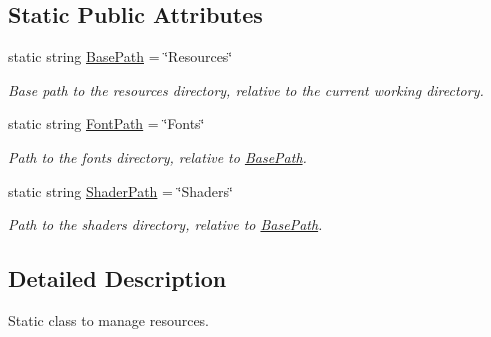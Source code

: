 \subsection*{Static Public Attributes}
\begin{DoxyCompactItemize}
\item 
static string \hyperlink{class_tri_devs_1_1_tri_engine2_d_1_1_resources_aa82e4dd3095618655c81abefb5c407fe}{Base\-Path} = \char`\"{}Resources\char`\"{}
\begin{DoxyCompactList}\small\item\em Base path to the resources directory, relative to the current working directory. \end{DoxyCompactList}\item 
static string \hyperlink{class_tri_devs_1_1_tri_engine2_d_1_1_resources_a3a9185a6ea2eff4b541a494e659c9d03}{Font\-Path} = \char`\"{}Fonts\char`\"{}
\begin{DoxyCompactList}\small\item\em Path to the fonts directory, relative to \hyperlink{class_tri_devs_1_1_tri_engine2_d_1_1_resources_aa82e4dd3095618655c81abefb5c407fe}{Base\-Path}. \end{DoxyCompactList}\item 
static string \hyperlink{class_tri_devs_1_1_tri_engine2_d_1_1_resources_ae1076be4f324014f90d33f5b1ac49625}{Shader\-Path} = \char`\"{}Shaders\char`\"{}
\begin{DoxyCompactList}\small\item\em Path to the shaders directory, relative to \hyperlink{class_tri_devs_1_1_tri_engine2_d_1_1_resources_aa82e4dd3095618655c81abefb5c407fe}{Base\-Path}. \end{DoxyCompactList}\end{DoxyCompactItemize}


\subsection{Detailed Description}
Static class to manage resources. 



